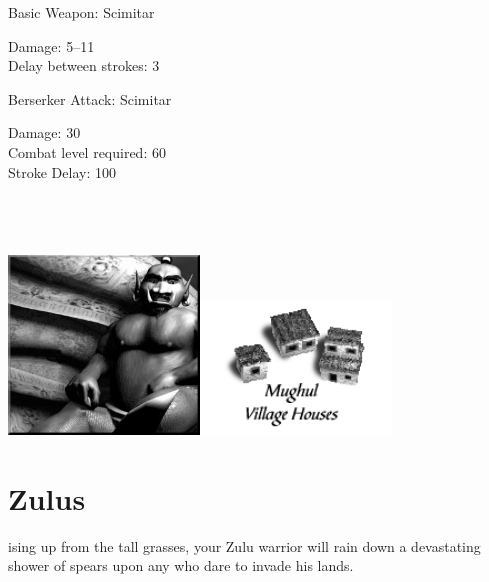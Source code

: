 Basic Weapon: Scimitar
\begin{changemargin}{.5cm}{0cm}
	Damage: 5–11 \\
	Delay between strokes: 3
\end{changemargin}
Berserker Attack: Scimitar
\begin{changemargin}{.5cm}{0cm}
	Damage: 30 \\
	Combat level required: 60 \\
	Stroke Delay: 100 \\ \\ \\ \\
\end{changemargin}

\begin{center}
	\includegraphics[width=2in]{Adjinni}\hspace{1pt}\includegraphics[width=2in]{Imughalhouse}
\end{center}

\clearpage

\section{Zulus}


ising up from the tall grasses, your Zulu warrior will rain down a devastating shower of spears upon any who dare to invade his lands.
	
